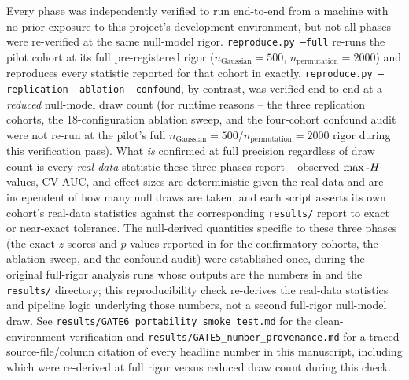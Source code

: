Every phase was independently verified to run end-to-end from a machine with no prior exposure to this
project's development environment, but not all phases were re-verified at the same null-model rigor.
\texttt{reproduce.py --full} re-runs the pilot cohort at its full pre-registered rigor
($n_{\text{Gaussian}}=500$, $n_{\text{permutation}}=2000$) and reproduces every statistic reported for that
cohort in  exactly. \texttt{reproduce.py --replication --ablation --confound}, by contrast,
was verified end-to-end at a \emph{reduced} null-model draw count (for runtime reasons -- the three
replication cohorts, the 18-configuration ablation sweep, and the four-cohort confound audit were not
re-run at the pilot's full $n_{\text{Gaussian}}=500$/$n_{\text{permutation}}=2000$ rigor during this
verification pass). What \emph{is} confirmed at full precision regardless of draw count is every
\emph{real-data} statistic these three phases report -- observed $\max\text{-}H_1$ values, CV-AUC, and effect
sizes are deterministic given the real data and are independent of how many null draws are taken, and each
script asserts its own cohort's real-data statistics against the corresponding \texttt{results/} report to
exact or near-exact tolerance. The null-derived quantities specific to these three phases (the exact
$z$-scores and $p$-values reported in  for the confirmatory cohorts, the ablation sweep,
and the confound audit) were established once, during the original full-rigor analysis runs whose outputs
are the numbers in  and the \texttt{results/} directory; this reproducibility check
re-derives the real-data statistics and pipeline logic underlying those numbers, not a second full-rigor
null-model draw. See \texttt{results/GATE6\allowbreak\_portability\allowbreak\_smoke\allowbreak\_test.md} for the
clean-environment verification and \texttt{results/GATE5\allowbreak\_number\allowbreak\_provenance.md} for a traced
source-file/column citation of every headline number in this manuscript, including which were re-derived at
full rigor versus reduced draw count during this check.
